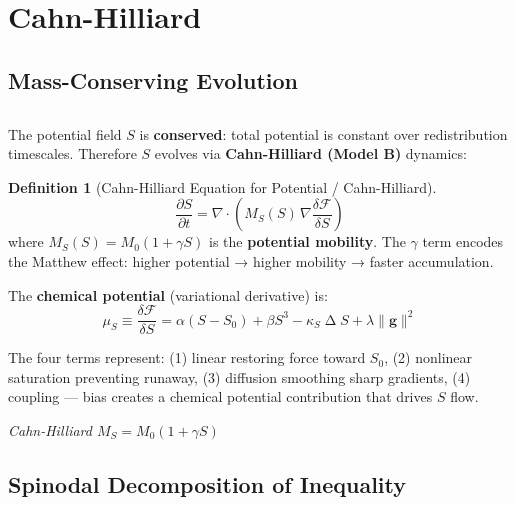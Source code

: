 \documentclass[12pt,a4paper]{article}
\theoremstyle{plain}
\theoremstyle{definition}
\newtheorem{definition}[theorem]{ Definition}
\newcommand{\cF}{\mathcal{F}}
\newcommand{\gf}{\mathbf{g}}          %
\newcommand{\Sf}{S}                   %
\DeclareMathOperator{\lap}{\Delta}
\newcommand{\cn}[1]{\textcolor{scxgray}{\textit{#1}}}
\begin{document}
\section*{Cahn-Hilliard}

\subsection{Mass-Conserving Evolution}
\subsection*{}

The potential field $\Sf$ is \textbf{conserved}: total potential is constant
over redistribution timescales. Therefore $\Sf$ evolves via
\textbf{Cahn-Hilliard (Model B)} dynamics:

\begin{definition}[Cahn-Hilliard Equation for Potential / Cahn-Hilliard]
\label{def:potential_ch}
\begin{equation}
    \frac{\partial \Sf}{\partial t} = \nabla \cdot \left(
        M_S(\Sf) \, \nabla \frac{\delta \cF}{\delta \Sf}
    \right)
    \label{eq:potential_ch}
\end{equation}
where $M_S(\Sf) = M_0(1 + \gamma\Sf)$ is the \textbf{potential mobility}.
The $\gamma$ term encodes the Matthew effect: higher potential → higher mobility → faster accumulation.
\end{definition}

The \textbf{chemical potential} (variational derivative) is:
\begin{equation}
    \mu_S \equiv \frac{\delta \cF}{\delta \Sf}
    = \alpha(\Sf - \Sf_0) + \beta \Sf^3 - \kappa_S \lap \Sf + \lambda \|\gf\|^2
    \label{eq:chemical_potential}
\end{equation}

The four terms represent: (1) linear restoring force toward $\Sf_0$,
(2) nonlinear saturation preventing runaway, (3) diffusion smoothing
sharp gradients, (4) coupling — bias creates a chemical potential
contribution that drives $\Sf$ flow.

\bigskip
\noindent
\cn{Cahn-Hilliard $M_S=M_0(1+\gamma\Sf)$}

\subsection{Spinodal Decomposition of Inequality}
\end{document}
